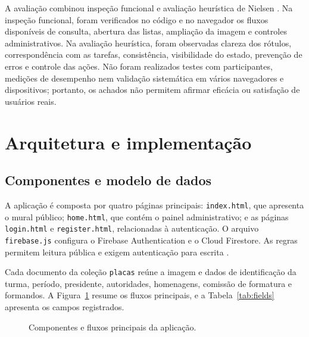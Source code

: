 \documentclass[12pt]{article}
\begin{document}
A avaliação combinou inspeção funcional e avaliação heurística de Nielsen
\cite{nielsen1993}. Na inspeção funcional, foram verificados no código e no
navegador os fluxos disponíveis de consulta, abertura das listas, ampliação da
imagem e controles administrativos. Na avaliação heurística, foram observadas
clareza dos rótulos, correspondência com as tarefas, consistência, visibilidade
do estado, prevenção de erros e controle das ações. Não foram realizados testes
com participantes, medições de desempenho nem validação sistemática em vários
navegadores e dispositivos; portanto, os achados não permitem afirmar eficácia
ou satisfação de usuários reais.

\section{Arquitetura e implementação}

\subsection{Componentes e modelo de dados}

A aplicação é composta por quatro páginas principais: \texttt{index.html},
que apresenta o mural público; \texttt{home.html}, que contém o painel
administrativo; e as páginas \texttt{login.html} e \texttt{register.html},
relacionadas à autenticação. O arquivo \texttt{firebase.js} configura o Firebase
Authentication e o Cloud Firestore. As regras permitem leitura pública e exigem
autenticação para escrita \cite{firestoresecurity}.

Cada documento da coleção \texttt{placas} reúne a imagem e dados de identificação
da turma, período, presidente, autoridades, homenagens, comissão de formatura e
formandos. A Figura~\ref{fig:arquitetura} resume os fluxos principais, e a
Tabela~\ref{tab:fields} apresenta os campos registrados.

\begin{figure}[ht]
\centering
{}
\caption{Componentes e fluxos principais da aplicação.}
\label{fig:arquitetura}
\end{figure}
\end{document}
